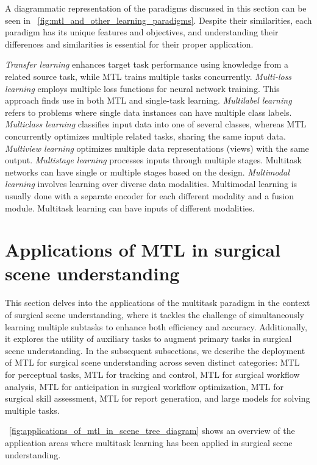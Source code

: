\documentclass[times,twocolumn,final]{elsarticle}
\newcommand{\figref}[1]{\figurename~\ref{#1}}
\begin{document}
A diagrammatic representation of the paradigms discussed in this section can be seen in \figref{fig:mtl_and_other_learning_paradigms}.
Despite their similarities, each paradigm has its unique features and objectives, and understanding their differences and similarities is essential for their proper application.

\emph{Transfer learning} enhances target task performance using knowledge from a related source task, while MTL trains multiple tasks concurrently.
\emph{Multi-loss learning} employs multiple loss functions for neural network training. This approach finds use in both MTL and single-task learning.
\emph{Multilabel learning} refers to problems where single data instances can have multiple class labels.
\emph{Multiclass learning} classifies input data into one of several classes, whereas MTL concurrently optimizes multiple related tasks, sharing the same input data.
\emph{Multiview learning} optimizes multiple data representations (views) with the same output.
\emph{Multistage learning} processes inputs through multiple stages. Multitask networks can have single or multiple stages based on the design.
\emph{Multimodal learning} involves learning over diverse data modalities. Multimodal learning is usually done with a separate encoder for each different modality and a fusion module. Multitask learning can have inputs of different modalities.


\section{Applications of MTL in surgical scene understanding} \label{sec::mtl_surgical}

This section delves into the applications of the multitask paradigm in the context of surgical scene understanding, where it tackles the challenge of simultaneously learning multiple subtasks to enhance both efficiency and accuracy.
Additionally, it explores the utility of auxiliary tasks to augment primary tasks in surgical scene understanding. 
In the subsequent subsections, we describe the deployment of MTL for surgical scene understanding across seven distinct categories: MTL for perceptual tasks, MTL for tracking and control, MTL for surgical workflow analysis, MTL for anticipation in surgical workflow optimization, MTL for surgical skill assessment, MTL for report generation, and large models for solving multiple tasks. 

\figref{fig:applications_of_mtl_in_scene_tree_diagram} shows an overview of the application areas where multitask learning has been applied in surgical scene understanding.
\end{document}
